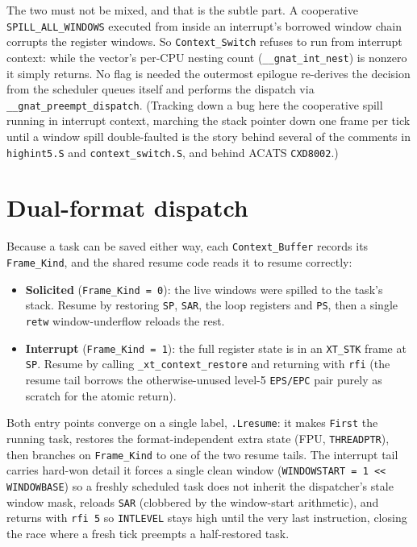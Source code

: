 The two must not be mixed, and that is the subtle part. A cooperative
\texttt{SPILL\_ALL\_WINDOWS} executed from inside an interrupt's borrowed window
chain corrupts the register windows. So \texttt{Context\_Switch} refuses to run
from interrupt context: while the vector's per-CPU nesting count
(\texttt{\_\_gnat\_int\_nest}) is nonzero it simply returns. No flag is needed
\textemdash{} the outermost epilogue re-derives the decision from the scheduler
queues itself and performs the dispatch via
\texttt{\_\_gnat\_preempt\_dispatch}. (Tracking down a bug here
\textemdash{} the cooperative spill running in interrupt context, marching the
stack pointer down one frame per tick until a window spill double-faulted
\textemdash{} is the story behind several of the comments in \texttt{highint5.S}
and \texttt{context\_switch.S}, and behind ACATS \texttt{CXD8002}.)

\section{Dual-format dispatch}

Because a task can be saved either way, each \texttt{Context\_Buffer} records its
\texttt{Frame\_Kind}, and the shared resume code reads it to resume correctly:

\begin{itemize}
  \item \textbf{Solicited} (\texttt{Frame\_Kind = 0}): the live windows were
        spilled to the task's stack. Resume by restoring \texttt{SP}, \texttt{SAR},
        the loop registers and \texttt{PS}, then a single \texttt{retw} \textemdash{}
        window-underflow reloads the rest.
  \item \textbf{Interrupt} (\texttt{Frame\_Kind = 1}): the full register state is in
        an \texttt{XT\_STK} frame at \texttt{SP}. Resume by calling
        \texttt{\_xt\_context\_restore} and returning with \texttt{rfi}
        (the resume tail borrows the otherwise-unused level-5
        \texttt{EPS/EPC} pair purely as scratch for the atomic return).
\end{itemize}

Both entry points converge on a single label, \texttt{.Lresume}: it makes
\texttt{First} the running task, restores the format-independent extra state (FPU,
\texttt{THREADPTR}), then branches on \texttt{Frame\_Kind} to one of the two
resume tails. The interrupt tail carries hard-won detail \textemdash{} it forces a
single clean window (\texttt{WINDOWSTART = 1 << WINDOWBASE}) so a freshly scheduled
task does not inherit the dispatcher's stale window mask, reloads \texttt{SAR}
(clobbered by the window-start arithmetic), and returns with \texttt{rfi 5} so
\texttt{INTLEVEL} stays high until the very last instruction, closing the race
where a fresh tick preempts a half-restored task.

